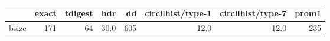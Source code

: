 \begin{tabular}{lrrrrrrr}
\toprule
{} &  exact &  tdigest &   hdr &   dd &  circllhist/type-1 &  circllhist/type-7 &  prom1 \\
\midrule
bsize &    171 &       64 &  30.0 &  605 &               12.0 &               12.0 &    235 \\
\bottomrule
\end{tabular}
